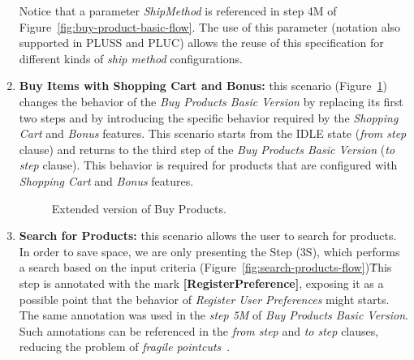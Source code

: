 \documentclass{acm_proc_article-sp}
\begin{document}
\begin{enumerate}
 Notice that a parameter \emph{ShipMethod} is referenced in step 4M of Figure~\ref{fig:buy-product-basic-flow}. The use of this parameter (notation also supported in PLUSS and PLUC) allows the reuse of this specification 
for different kinds of \emph{ship method} configurations.


\item {\bf Buy Items with Shopping Cart and Bonus:} this scenario (Figure~\ref{fig:buy-product-changing-flow}) changes the behavior of the \emph{Buy Products Basic Version} by replacing its first two steps and by introducing the specific behavior required by the \emph{Shopping Cart} and 
\emph{Bonus} features. This scenario starts from the IDLE state (\emph{from step} clause) and returns to the third step of the \emph{Buy Products Basic Version} (\emph{to step} clause). This behavior is required for products that are configured with \emph{Shopping Cart} and \emph{Bonus} features.

\begin{figure}[h]
\caption{Extended version of Buy Products.}
\label{fig:buy-product-changing-flow}
\end{figure}

\item {\bf Search for Products:} this scenario allows the user to search for products. In order to save space, we are only presenting the Step (3S), which performs a search based on the input criteria (Figure~\ref{fig:search-products-flow})\. This step is annotated with the mark \mbox{{\bf [RegisterPreference]}}, exposing it as a possible point that the behavior of \emph{Register User Preferences} might starts. The same annotation was used in the \emph{step 5M} of \emph{Buy Products Basic Version}. Such annotations can be referenced in the \emph{from step} and \emph{to step} clauses, reducing the problem of \emph{fragile pointcuts}~\cite{rashid-aosd-2007}.


\end{enumerate}
\end{document}
